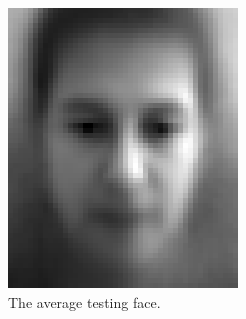 \documentclass[a4paper, 10pt, conference]{ieeeconf}
\begin{document}
\begin{figure}[!ht]
	\captionsetup[subfigure]{position=b}
        \centering
        \begin{subfigure}{0.1\textwidth}
                \includegraphics[width=\textwidth]{src/mean_face.png}
                \caption{The average testing face.}
                \label{fig:meanface}
        \end{subfigure}
        ~
        \begin{subfigure}{0.1\textwidth}

\end{subfigure}
\end{figure}
\end{document}
